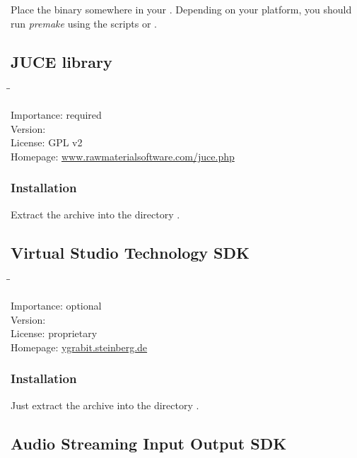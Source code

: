 Place the binary somewhere in your .  Depending on your
platform, you should run \emph{premake} using the scripts
 or .

\subsection{JUCE library}

\begin{tabbing}
  \hspace*{6em}\=\=\kill

  Importance:  \> required \\
  Version:      \\
  License:     \> GPL v2 \\
  Homepage:    \> \href{http://www.rawmaterialsoftware.com/juce.php}{www.rawmaterialsoftware.com/juce.php}
\end{tabbing}

\subsubsection{Installation}

Extract the archive into the directory .

\subsection{Virtual Studio Technology SDK}

\begin{tabbing}
  \hspace*{6em}\=\=\kill

  Importance:  \> optional \\
  Version:      \\
  License:     \> proprietary \\
  Homepage:    \> \href{http://ygrabit.steinberg.de/}{ygrabit.steinberg.de}
\end{tabbing}

\subsubsection{Installation}

Just extract the archive into the directory
.

\subsection{Audio Streaming Input Output SDK}

